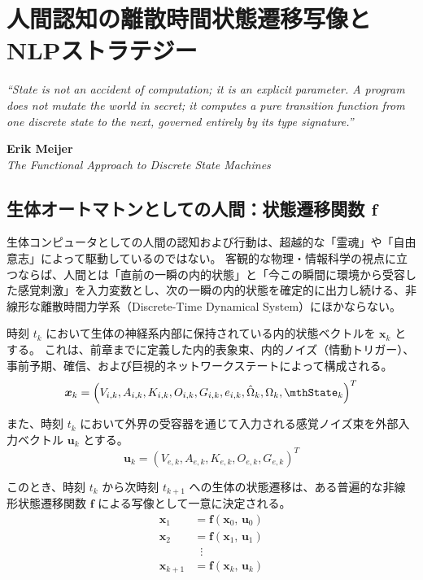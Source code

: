 \chapter{人間認知の離散時間状態遷移写像とNLPストラテジー}
\epigraph{%
  \itshape ``State is not an accident of computation; it is an explicit parameter.
  A program does not mutate the world in secret;
  it computes a pure transition function from one discrete state to the next,
  governed entirely by its type signature.''
}{%
  \textbf{Erik Meijer}\\
  \textit{The Functional Approach to Discrete State Machines}
}
\section{生体オートマトンとしての人間：状態遷移関数 $\boldsymbol{f}$}

生体コンピュータとしての人間の認知および行動は、超越的な「霊魂」や「自由意志」によって駆動しているのではない。
客観的な物理・情報科学の視点に立つならば、人間とは「直前の一瞬の内的状態」と「今この瞬間に環境から受容した感覚刺激」を入力変数とし、次の一瞬の内的状態を確定的に出力し続ける、非線形な離散時間力学系（Discrete-Time Dynamical System）にほかならない。

時刻 $t_k$ において生体の神経系内部に保持されている内的状態ベクトルを $\boldsymbol{x}_k$ とする。
これは、前章までに定義した内的表象束、内的ノイズ（情動トリガー）、事前予期、確信、および巨視的ネットワークステートによって構成される。
\begin{equation}
    \boldsymbol{x}_k = \left( V_{i,k}, A_{i,k}, K_{i,k}, O_{i,k}, G_{i,k}, e_{i,k}, \hat{\Omega}_k, \Omega_k, \mthState_k \right)^T
\end{equation}

また、時刻 $t_k$ において外界の受容器を通じて入力される感覚ノイズ束を外部入力ベクトル $\boldsymbol{u}_k$ とする。
\begin{equation}
    \boldsymbol{u}_k = \left( V_{e,k}, A_{e,k}, K_{e,k}, O_{e,k}, G_{e,k} \right)^T
\end{equation}

このとき、時刻 $t_k$ から次時刻 $t_{k+1}$ への生体の状態遷移は、ある普遍的な非線形状態遷移関数 $\boldsymbol{f}$ による写像として一意に決定される。
\begin{align}
    \boldsymbol{x}_1 &= \boldsymbol{f}\left( \boldsymbol{x}_0, \, \boldsymbol{u}_0 \right) \\
    \boldsymbol{x}_2 &= \boldsymbol{f}\left( \boldsymbol{x}_1, \, \boldsymbol{u}_1 \right) \\
    &\;\;\vdots \nonumber \\
    \boldsymbol{x}_{k+1} &= \boldsymbol{f}\left( \boldsymbol{x}_k, \, \boldsymbol{u}_k \right)
\end{align}

